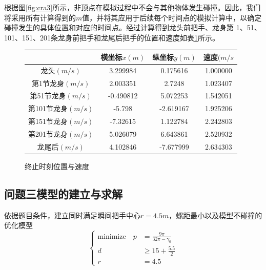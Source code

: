 \documentclass[withoutpreface,bwprint]{cumcmthesis}
\begin{document}
\begin{itemize}
根据图\ref{fig:cra3}所示，非顶点在模拟过程中不会与其他物体发生碰撞。因此，我们将采用所有计算得到的$m$值，并将其应用于后续每个时间点的模拟计算中，以确定碰撞发生的具体位置和对应的时间点。经过计算得到龙头前把手、龙身第 1、51、101、151、201条龙身前把手和龙尾后把手的位置和速度如表\ref{fig:end}所示。
\begin{figure}
	\centering
	\begin{tabular}{|c|c|c|c|}
		\hline
		& \textbf{横坐标$x(m)$} & \textbf{纵坐标$y(m)$} & \textbf{速度$(m/s$} \\ \hline
		龙头$(m/s)$ & 3.299984 & 0.175616 & 1.000000 \\ \hline
		第1节龙身$(m/s)$ & 2.003351 & 2.7248 & 1.023407 \\ \hline
		第51节龙身$(m/s)$ & -0.490812 & 5.072253 & 1.542051 \\ \hline
		第101节龙身$(m/s)$ & -5.798 & -2.619167 & 1.925206 \\ \hline
		第151节龙身$(m/s)$ & -7.32615 & 1.122784 & 2.242803 \\ \hline
		第201节龙身$(m/s)$ & 5.026079 & 6.643861 & 2.520932 \\ \hline
		龙尾后$(m/s)$ & 4.102846 & -7.677999 & 2.634303 \\ \hline
	\end{tabular}
	\caption{终止时刻位置与速度} 
	\label{fig:end}          
\end{figure}
\end{itemize}




\subsection{问题三模型的建立与求解}
依据题目条件，建立同时满足瞬间把手中心$r = 4.5m$，螺距最小以及模型不碰撞的优化模型
\[
\left\{
\begin{aligned}
	\text{minimize}\quad p &= \frac{9\pi}{32\pi - \gamma_0}\\
	d &\geq 15+ \frac{5.5}{2}\\
	r &= 4.5
\end{aligned}
\right.
\]
\end{document}
